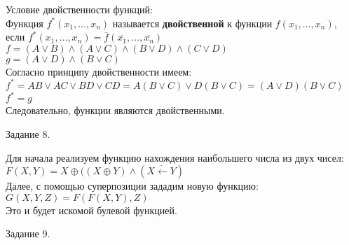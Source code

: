 \documentclass[a4paper,12pt]{report} %
\begin{document}
\begin{flushleft}
	Условие двойственности функций:\\
	Функция $f^{*}(x_1, \ldots , x_n)$ называется \textbf{двойственной} к функции $f(x_1, \ldots , x_n)$,\\
	если $f^{*}(x_1, \ldots , x_n) = \overline{f}(\overline{x_1}, \ldots , \overline{x_n})$\\
	\bigskip
	$f=(A \vee B) \wedge (A \vee C) \wedge (B \vee D) \wedge (C \vee D)$\\
	$g= (A \vee D) \wedge (B \vee C)$\\
	Согласно принципу двойственности имеем:\\
	$f^{*}= AB \vee AC \vee BD \vee CD = A(B \vee C) \vee D(B \vee C) = (A\vee D)(B \vee C)$\\
	$f^{*} = g$\\
	Следовательно, функции являются двойственными.
\end{flushleft}

\bigskip

\begin{center}
	Задание 8.\\
\end{center}

\begin{flushleft}
	Для начала реализуем функцию нахождения наибольшего числа из двух чисел:\\
	$F(X,Y)=X \oplus ((X \oplus Y) \wedge (\overline{X \leftarrow Y}) $\\
	Далее, с помощью суперпозиции зададим новую функцию:\\
	$G(X,Y,Z) = F(F(X,Y),Z)$\\
	Это и будет искомой булевой функцией.
	
\end{flushleft}

\bigskip

\begin{center}
	Задание 9.\\
\end{center}
\end{document}
